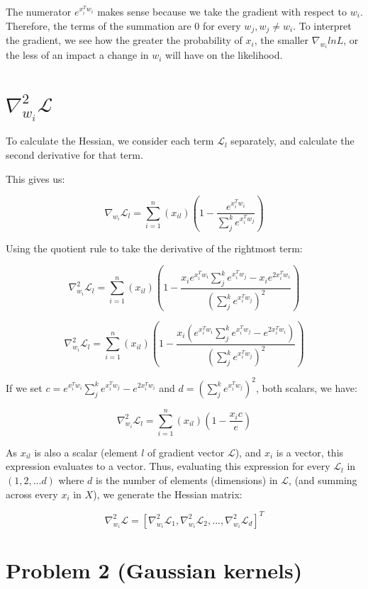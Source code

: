 \documentclass[11pt]{article}
\begin{document}
\begin{enumerate}
The numerator $e^{x_i^Tw_i}$ makes sense because we take the gradient with respect to $w_i$. Therefore, the terms of the summation are 0 for every $w_j, w_j \neq w_i$.
To interpret the gradient, we see how the greater the probability of $x_i$, the smaller $\nabla_{w_i}lnL$, or the less of an impact a change in $w_i$ will have on the likelihood.

\section*{$\nabla^2_{w_i} \mathcal{L}$}

To calculate the Hessian, we consider each term $\mathcal{L}_l$ separately, and calculate the second derivative for that term.

This gives us:

\[
\nabla_{w_i} \mathcal{L}_l = \sum_{i=1}^{n}(x_{il}) (1 - \frac{e^{x_i^Tw_i}}{\sum_j^k e^{x_i^Tw_j}})
\]

Using the quotient rule to take the derivative of the rightmost term:

\[
\nabla_{w_i}^2 \mathcal{L}_l = \sum_{i=1}^{n}(x_{il}) (1 - \frac{x_i e^{x_i^Tw_i}\sum_j^k e^{x_i^Tw_j} - x_i e^{2x_i^Tw_i}}{(\sum_j^k e^{x_i^Tw_j})^2})
\]

\[
\nabla_{w_i}^2 \mathcal{L}_l = \sum_{i=1}^{n}(x_{il}) (1 - \frac{x_i (e^{x_i^Tw_i}\sum_j^k e^{x_i^Tw_j} - e^{2x_i^Tw_i})}{(\sum_j^k e^{x_i^Tw_j})^2})
\]

If we set $c = e^{x_i^Tw_i}\sum_j^k e^{x_i^Tw_j} - e^{2x_i^Tw_i}$ and $d = (\sum_j^k e^{x_i^Tw_j})^2$, both scalars, we have:

\[
\nabla_{w_i}^2 \mathcal{L}_l = \sum_{i=1}^{n}(x_{il}) (1 - \frac{x_i c}{e})
\]

As $x_{il}$ is also a scalar (element $l$ of gradient vector $ \mathcal{L}$), and $x_i$ is a vector, this expression evaluates to a vector. Thus, evaluating this expression for every $\mathcal{L}_l$ in $(1, 2, ... d)$ where $d$ is the number of elements (dimensions) in  $\mathcal{L}$, (and summing across every $x_i$ in $X$), we generate the Hessian matrix:

\[
\nabla_{w_i}^2 \mathcal{L} = [\nabla_{w_i}^2 \mathcal{L}_1, \nabla_{w_i}^2 \mathcal{L}_2, ..., \nabla_{w_i}^2 \mathcal{L}_d]^T
\]

\end{enumerate}

\section*{Problem 2 (Gaussian kernels)}
\end{document}
